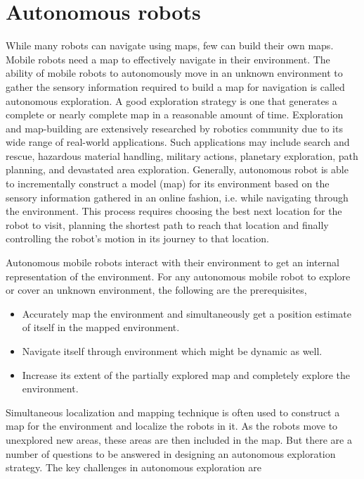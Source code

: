 \section{Autonomous robots}
While many robots can navigate using maps, few can build their own maps. Mobile robots need a map to effectively navigate in their environment. The ability of mobile robots to autonomously move in an unknown environment to gather the sensory information required to build a map for navigation is called autonomous exploration. A good exploration strategy is one that generates a complete or nearly complete map in a reasonable amount of time. Exploration and map-building are extensively researched by robotics community due to its wide range of real-world applications. Such applications may include search and rescue, hazardous material handling, military actions, planetary exploration, path planning, and devastated area exploration\cite{17}. Generally, autonomous robot is able to incrementally construct a model (map) for its environment based on the sensory information gathered in an online fashion, i.e. while navigating through the environment. This process requires choosing the best next location for the robot to visit, planning the shortest path to reach that location and finally controlling the robot’s motion in its journey to that location. 
\par Autonomous mobile robots interact with their environment to get an internal representation of the environment. For any autonomous mobile robot to explore or cover an unknown environment, the following are the prerequisites, 
\begin{itemize}
    \item Accurately map the environment and simultaneously get a position estimate of itself in the mapped environment.
    \item Navigate itself through environment which might be dynamic as well.
    \item Increase its extent of the partially explored map and completely explore the environment.
\end{itemize}

\par Simultaneous localization and mapping technique is often used to construct a map for the environment and localize the robots in it. As the robots move to unexplored new areas, these areas are then included in the map. But there are a number of questions to be answered in designing an autonomous exploration strategy. The key challenges in autonomous exploration are

